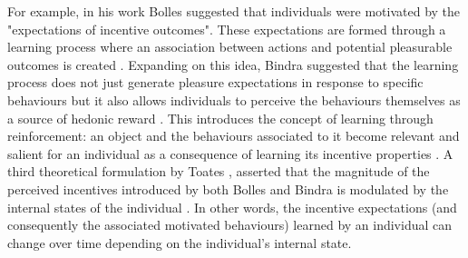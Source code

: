 For example, in his work Bolles \cite{bolles1972reinforcement} suggested that individuals were motivated by the "expectations of incentive outcomes". These expectations are formed through a learning process where an association between actions and potential pleasurable outcomes is created \cite{bolles1972reinforcement,berridge2004motivation}. Expanding on this idea, Bindra \cite{bindra1978adaptive} suggested that the learning process does not just generate pleasure expectations in response to specific behaviours but it also allows individuals to perceive the behaviours themselves as a source of hedonic reward \cite{bindra1978adaptive,berridge2004motivation}.
This introduces the concept of learning through reinforcement: an object and the behaviours associated to it become relevant and salient for an individual as a consequence of learning its incentive properties \cite{berridge2004motivation}. A third theoretical formulation by Toates \cite{toates1994comparing}, asserted that the magnitude of the perceived incentives introduced by both Bolles and Bindra is modulated by the internal states of the individual \cite{toates1994comparing,berridge2004motivation}. In other words, the incentive expectations (and consequently the associated motivated behaviours) learned by an individual can change over time depending on the individual's internal state. 

